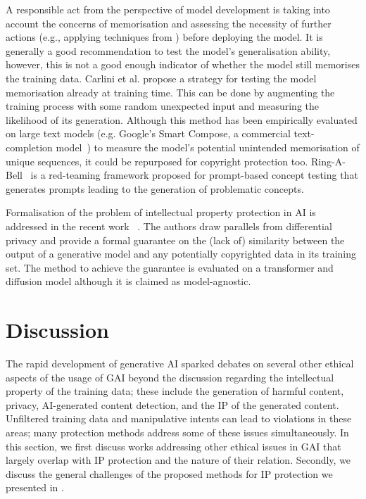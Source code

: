 \documentclass[conference,table]{IEEEtran}
\begin{document}
A responsible act from the perspective of model development is taking into account the concerns of memorisation and assessing the necessity of further actions (e.g., applying techniques from ) before deploying the model.
It is generally a good recommendation to test the model's generalisation ability, however, this is not a good enough indicator of whether the model still memorises the training data. 
Carlini et al. \cite{carlini_secret_2019} propose a strategy for testing the model memorisation already at training time. 
This can be done by augmenting the training process with some random unexpected input and measuring the likelihood of its generation. 
Although this method has been empirically evaluated on large text models (e.g. Google's Smart Compose, a commercial text-completion model~\cite{chen_gmail_2019}) to measure the model's potential unintended memorisation of unique sequences, it could be repurposed for copyright protection too. 
Ring-A-Bell~\cite{tsai_ring--bell_2023} is a red-teaming framework proposed for prompt-based concept testing that generates prompts leading to the generation of problematic concepts.

Formalisation of the problem of intellectual property protection in AI is addressed in the recent work ~\cite{vyas_provable_2023}. 
The authors draw parallels from differential privacy and provide a formal guarantee on the (lack of) similarity between the output of a generative model and any potentially copyrighted data in its training set. 
The method to achieve the guarantee is evaluated on a transformer and diffusion model although it is claimed as model-agnostic.


\section{Discussion}\label{sec:discussion}
The rapid development of generative AI sparked debates on several other ethical aspects of the usage of GAI beyond the discussion regarding the intellectual property of the training data; these include the generation of harmful content, privacy, AI-generated content detection, and the IP of the generated content. 
Unfiltered training data and manipulative intents can lead to violations in these areas; many protection methods address some of these issues simultaneously. 
In this section, we first discuss works addressing other ethical issues in GAI that largely overlap with IP protection and the nature of their relation. 
Secondly, we discuss the general challenges of the proposed methods for IP protection we presented in .
\end{document}
